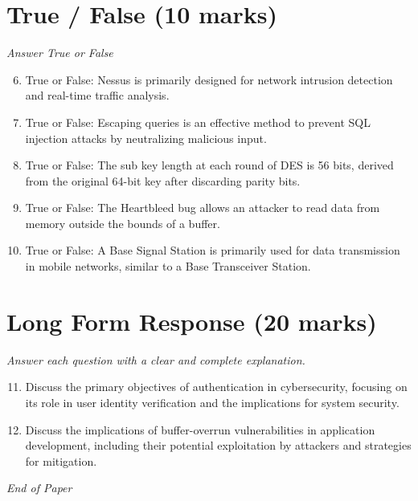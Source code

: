 \documentclass[12pt]{article}
\begin{document}
\section*{True / False (10 marks)}
\textit{Answer True or False}
\begin{enumerate}[label=\arabic*.]
\setcounter{enumi}{5}
\item True or False: Nessus is primarily designed for network intrusion detection and real-time traffic analysis.
\item True or False: Escaping queries is an effective method to prevent SQL injection attacks by neutralizing malicious input.
\item True or False: The sub key length at each round of DES is 56 bits, derived from the original 64-bit key after discarding parity bits.
\item True or False: The Heartbleed bug allows an attacker to read data from memory outside the bounds of a buffer.
\item True or False: A Base Signal Station is primarily used for data transmission in mobile networks, similar to a Base Transceiver Station.
\end{enumerate}

\section*{Long Form Response (20 marks)}
\textit{Answer each question with a clear and complete explanation.}
\begin{enumerate}[label=\arabic*.]
\setcounter{enumi}{10}
\item Discuss the primary objectives of authentication in cybersecurity, focusing on its role in user identity verification and the implications for system security.
\item Discuss the implications of buffer-overrun vulnerabilities in application development, including their potential exploitation by attackers and strategies for mitigation.
\end{enumerate}

\vfill
\noindent\textit{End of Paper}
\end{document}
